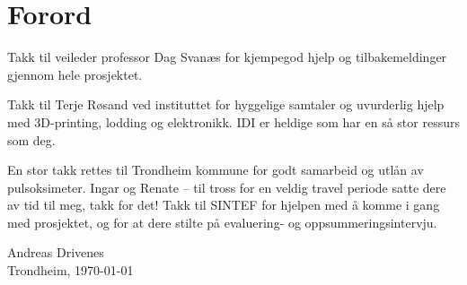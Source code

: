 \chapter*{Forord}
Takk til veileder professor Dag Svanæs for kjempegod hjelp og tilbakemeldinger gjennom hele prosjektet.

Takk til Terje Røsand ved instituttet for hyggelige samtaler og uvurderlig hjelp med 3D-printing, lodding og elektronikk.
IDI er heldige som har en så stor ressurs som deg.

En stor takk rettes til Trondheim kommune for godt samarbeid og utlån av pulsoksimeter.
Ingar og Renate -- til tross for en veldig travel periode satte dere av tid til meg, takk for det!
Takk til SINTEF for hjelpen med å komme i gang med prosjektet, og for at dere
stilte på evaluering- og oppsummeringsintervju.

\begin{flushright}
Andreas Drivenes\\[0.8pc]
Trondheim, \today
\end{flushright}
